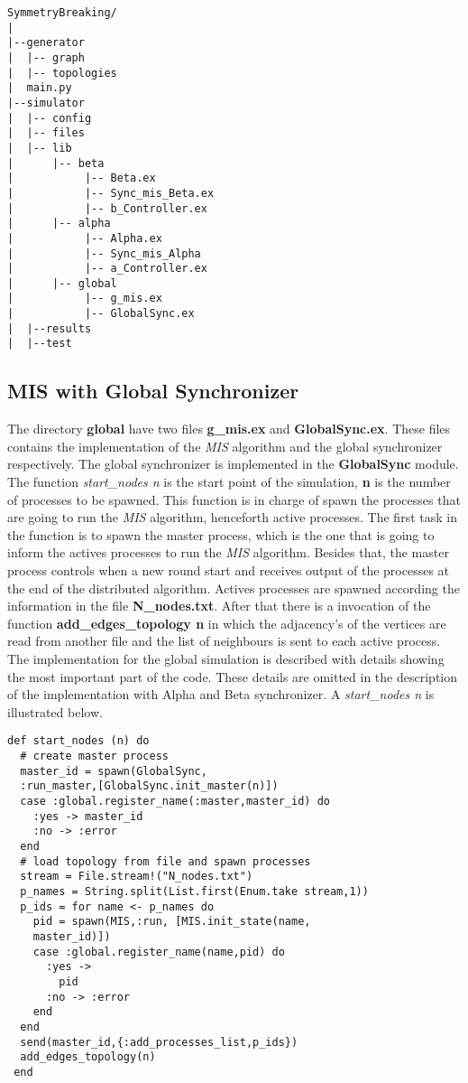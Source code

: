 \begin{verbatim}
SymmetryBreaking/
|
|--generator
|  |-- graph
|  |-- topologies
|  main.py
|--simulator
|  |-- config
|  |-- files
|  |-- lib
|      |-- beta
|           |-- Beta.ex
|           |-- Sync_mis_Beta.ex
|           |-- b_Controller.ex
|      |-- alpha
|           |-- Alpha.ex
|           |-- Sync_mis_Alpha
|           |-- a_Controller.ex
|      |-- global
|           |-- g_mis.ex
|           |-- GlobalSync.ex
|  |--results
|  |--test
\end{verbatim}

\subsection{MIS with Global Synchronizer}
 

The directory \textbf{global} have two files \textbf{g\_mis.ex} and \textbf{GlobalSync.ex}. These files contains the implementation of the \textit{MIS} algorithm and the global synchronizer respectively. The global synchronizer is implemented in the \textbf{GlobalSync} module. The function \textit{start\_nodes n} is the start point of the simulation, \textbf{n} is the number of processes to be spawned. This function is in charge of spawn the processes that are going to run the \textit{MIS} algorithm, henceforth active processes. The first task in the function is to spawn the master process, which is the one that is going to inform the actives processes to run the \textit{MIS} algorithm. Besides that, the master process controls when a new round start and receives output of the processes at the end of the distributed algorithm. Actives processes are spawned according the information in the file  \textbf{N\_nodes.txt}. After that there is a invocation of the function \textbf{add\_edges\_topology n} in which the adjacency's of the vertices are read from another file and the list of neighbours is sent to each active process. The implementation for the global simulation is described with details showing the most important part of the code. These details are omitted in the description of the implementation with Alpha and Beta synchronizer. A \textit{start\_nodes n} is illustrated below.


\begin{lstlisting}[frame=single]
def start_nodes (n) do
  # create master process
  master_id = spawn(GlobalSync,
  :run_master,[GlobalSync.init_master(n)])
  case :global.register_name(:master,master_id) do
    :yes -> master_id
    :no -> :error
  end
  # load topology from file and spawn processes
  stream = File.stream!("N_nodes.txt")
  p_names = String.split(List.first(Enum.take stream,1))
  p_ids = for name <- p_names do
    pid = spawn(MIS,:run, [MIS.init_state(name,
    master_id)])
    case :global.register_name(name,pid) do
      :yes ->
        pid
      :no -> :error
    end
  end
  send(master_id,{:add_processes_list,p_ids})
  add_edges_topology(n)
 end
\end{lstlisting}


